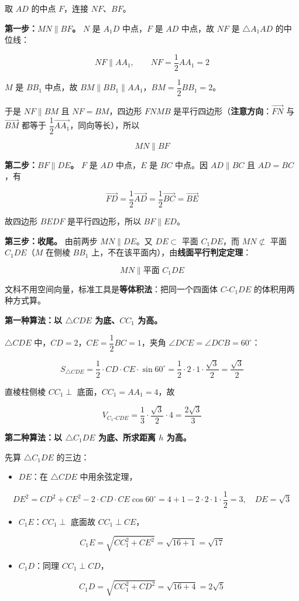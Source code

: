 取 $AD$ 的中点 $F$，连接 $NF$、$BF$。

\textbf{第一步：$MN\parallel BF$。}
$N$ 是 $A_1D$ 中点，$F$ 是 $AD$ 中点，故 $NF$ 是 $\triangle A_1AD$ 的中位线：

\[NF\parallel AA_1,\qquad NF=\frac12AA_1=2\]

$M$ 是 $BB_1$ 中点，故 $BM\parallel BB_1\parallel AA_1$，$BM=\dfrac12BB_1=2$。

于是 $NF\parallel BM$ 且 $NF=BM$，四边形 $FNMB$ 是平行四边形（\textbf{注意方向}：$\overrightarrow{FN}$ 与 $\overrightarrow{BM}$ 都等于 $\dfrac12\overrightarrow{AA_1}$，同向等长），所以

\[MN\parallel BF\]

\textbf{第二步：$BF\parallel DE$。}
$F$ 是 $AD$ 中点，$E$ 是 $BC$ 中点。因 $AD\parallel BC$ 且 $AD=BC$，有

\[\overrightarrow{FD}=\frac12\overrightarrow{AD}=\frac12\overrightarrow{BC}=\overrightarrow{BE}\]

故四边形 $BEDF$ 是平行四边形，所以 $BF\parallel ED$。

\textbf{第三步：收尾。}
由前两步 $MN\parallel DE$。又 $DE\subset$ 平面 $C_1DE$，而 $MN\not\subset$ 平面 $C_1DE$（$M$ 在侧棱 $BB_1$ 上，不在该平面内），由\textbf{线面平行判定定理}：

\[MN\parallel\text{平面 }C_1DE\]


文科不用空间向量，标准工具是\textbf{等体积法}：把同一个四面体 $C\text{-}C_1DE$ 的体积用两种方式算。

\textbf{第一种算法：以 $\triangle CDE$ 为底、$CC_1$ 为高。}

$\triangle CDE$ 中，$CD=2$，$CE=\dfrac12BC=1$，夹角 $\angle DCE=\angle DCB=60^\circ$：

\[S_{\triangle CDE}=\frac12\cdot CD\cdot CE\cdot\sin60^\circ=\frac12\cdot2\cdot1\cdot\frac{\sqrt3}2=\frac{\sqrt3}2\]

直棱柱侧棱 $CC_1\perp$ 底面，$CC_1=AA_1=4$，故

\[V_{C_1\text{-}CDE}=\frac13\cdot\frac{\sqrt3}2\cdot4=\frac{2\sqrt3}3\]

\textbf{第二种算法：以 $\triangle C_1DE$ 为底、所求距离 $h$ 为高。}

先算 $\triangle C_1DE$ 的三边：

\begin{itemize}
\item $DE$：在 $\triangle CDE$ 中用余弦定理，
\end{itemize}
\[DE^{2}=CD^{2}+CE^{2}-2\cdot CD\cdot CE\cos60^\circ=4+1-2\cdot2\cdot1\cdot\frac12=3,\quad DE=\sqrt3\]
\begin{itemize}
\item $C_1E$：$CC_1\perp$ 底面故 $CC_1\perp CE$，
\end{itemize}
\[C_1E=\sqrt{CC_1^{2}+CE^{2}}=\sqrt{16+1}=\sqrt{17}\]
\begin{itemize}
\item $C_1D$：同理 $CC_1\perp CD$，
\end{itemize}
\[C_1D=\sqrt{CC_1^{2}+CD^{2}}=\sqrt{16+4}=2\sqrt5\]

